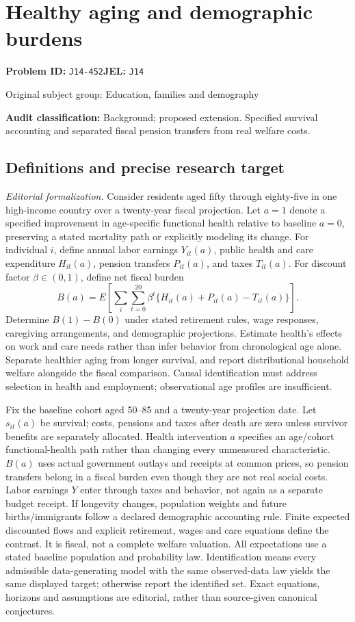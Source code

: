 \documentclass[11pt,a4paper]{article}
\begin{document}
\section*{Healthy aging and demographic burdens}
\textbf{Problem ID:} \texttt{J14-452}\quad \textbf{JEL:} \texttt{J14}\par
\label{problem:OP-0459}
{\sffamily\small\color{muted}Original subject group: Education, families and demography\par}
\label{definitions:problem:30007741}
\textbf{Audit classification:} Background; proposed extension. Specified survival accounting and separated fiscal pension transfers from real welfare costs.
\subsection*{Definitions and precise research target}
\textit{Editorial formalization.} Consider residents aged fifty through eighty-five in one high-income country over a twenty-year fiscal projection. Let \(a=1\) denote a specified improvement in age-specific functional health relative to baseline \(a=0\), preserving a stated mortality path or explicitly modeling its change. For individual \(i\), define annual labor earnings \(Y_{it}(a)\), public health and care expenditure \(H_{it}(a)\), pension transfers \(P_{it}(a)\), and taxes \(T_{it}(a)\). For discount factor \(\beta\in(0,1)\), define net fiscal burden
\[B(a)=E\!\left[\sum_i\sum_{t=0}^{20}\beta^t\{H_{it}(a)+P_{it}(a)-T_{it}(a)\}\right].\]
Determine \(B(1)-B(0)\) under stated retirement rules, wage responses, caregiving arrangements, and demographic projections. Estimate health’s effects on work and care needs rather than infer behavior from chronological age alone. Separate healthier aging from longer survival, and report distributional household welfare alongside the fiscal comparison. Causal identification must address selection in health and employment; observational age profiles are insufficient.

Fix the baseline cohort aged 50–85 and a twenty-year projection date. Let \(s_{it}(a)\) be survival; costs, pensions and taxes after death are zero unless survivor benefits are separately allocated. Health intervention \(a\) specifies an age/cohort functional-health path rather than changing every unmeasured characteristic. \(B(a)\) uses actual government outlays and receipts at common prices, so pension transfers belong in a fiscal burden even though they are not real social costs. Labor earnings \(Y\) enter through taxes and behavior, not again as a separate budget receipt. If longevity changes, population weights and future births/immigrants follow a declared demographic accounting rule. Finite expected discounted flows and explicit retirement, wages and care equations define the contrast. It is fiscal, not a complete welfare valuation. All expectations use a stated baseline population and probability law. Identification means every admissible data-generating model with the same observed-data law yields the same displayed target; otherwise report the identified set. Exact equations, horizons and assumptions are editorial, rather than source-given canonical conjectures.
\end{document}
